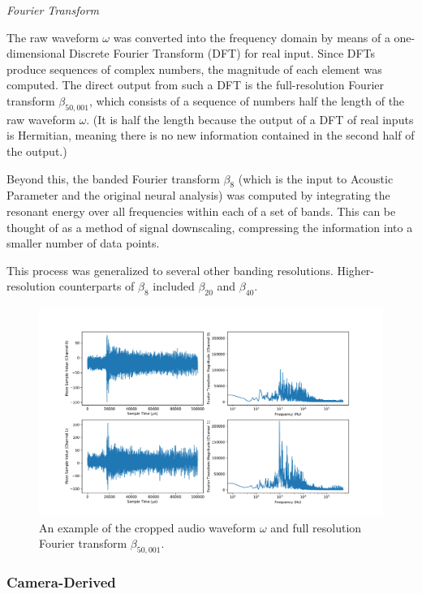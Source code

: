 \documentclass[10pt]{article}
\begin{document}
\textit{Fourier Transform}

The raw waveform $\omega$ was converted into the frequency domain by means of a one-dimensional Discrete Fourier Transform (DFT) for real input. Since DFTs produce sequences of complex numbers, the magnitude of each element was computed. The direct output from such a DFT is the full-resolution Fourier transform $\beta _{50,001}$, which consists of a sequence of numbers half the length of the raw waveform $\omega$. (It is half the length because the output of a DFT of real inputs is Hermitian, meaning there is no new information contained in the second half of the output.)

Beyond this, the banded Fourier transform $\beta_{8}$ (which is the input to Acoustic Parameter and the original neural analysis) was computed by integrating the resonant energy over all frequencies within each of a set of bands. This can be thought of as a method of signal downscaling, compressing the information into a smaller number of data points.

This process was generalized to several other banding resolutions. Higher-resolution counterparts of $\beta_{8}$ included $\beta_{20}$ and $\beta_{40}$.

\begin{figure}[h]
    \centering
    \includegraphics[width=\textwidth]{audio}
    \caption{\label{} An example of the cropped audio waveform $\omega$ and full resolution Fourier transform $\beta_{50,001}$.}
\end{figure}

\subsubsection{Camera-Derived}
\end{document}

